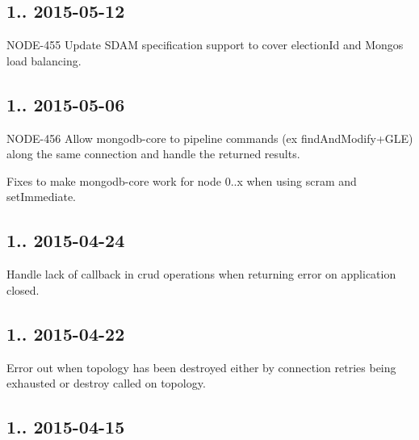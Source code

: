 \subsection*{1.. 2015-\/05-\/12 }


\begin{DoxyItemize}
\item N\+O\+D\+E-\/455 Update S\+D\+AM specification support to cover election\+Id and Mongos load balancing.
\end{DoxyItemize}

\subsection*{1.. 2015-\/05-\/06 }


\begin{DoxyItemize}
\item N\+O\+D\+E-\/456 Allow mongodb-\/core to pipeline commands (ex find\+And\+Modify+\+G\+LE) along the same connection and handle the returned results.
\item Fixes to make mongodb-\/core work for node 0..\+x when using scram and set\+Immediate.
\end{DoxyItemize}

\subsection*{1.. 2015-\/04-\/24 }


\begin{DoxyItemize}
\item Handle lack of callback in crud operations when returning error on application closed.
\end{DoxyItemize}

\subsection*{1.. 2015-\/04-\/22 }


\begin{DoxyItemize}
\item Error out when topology has been destroyed either by connection retries being exhausted or destroy called on topology.
\end{DoxyItemize}

\subsection*{1.. 2015-\/04-\/15 }


